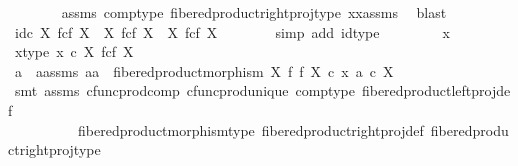 \begin{isabellebody}
\ \ \ \ \ \ \isamarkupfalse%
\ assms{\isacharparenleft}{\kern0pt}{}{\isacharparenright}{\kern0pt}\ comp{\isacharunderscore}{\kern0pt}type\ fibered{\isacharunderscore}{\kern0pt}product{\isacharunderscore}{\kern0pt}right{\isacharunderscore}{\kern0pt}proj{\isacharunderscore}{\kern0pt}type\ xx{\isacharunderscore}{\kern0pt}assms\ \isamarkupfalse%
\ blast\isanewline
\ \ \ \ \isamarkupfalse%
\ {\isachardoublequoteopen}id\isactrlsub c\ {\isacharparenleft}{\kern0pt}X\ \isactrlbsub f\isactrlesub {\isasymtimes}\isactrlsub c\isactrlbsub f\isactrlesub \ X{\isacharparenright}{\kern0pt}\ {\isacharcolon}{\kern0pt}\ X\ \isactrlbsub f\isactrlesub {\isasymtimes}\isactrlsub c\isactrlbsub f\isactrlesub \ X\ {\isasymrightarrow}\ X\ \isactrlbsub f\isactrlesub {\isasymtimes}\isactrlsub c\isactrlbsub f\isactrlesub \ X{\isachardoublequoteclose}\isanewline
\ \ \ \ \ \ \isamarkupfalse%
\ {\isacharparenleft}{\kern0pt}simp\ add{\isacharcolon}{\kern0pt}\ id{\isacharunderscore}{\kern0pt}type{\isacharparenright}{\kern0pt}\isanewline
\ \ \isamarkupfalse%
\isanewline
\ \ \ \ \isamarkupfalse%
\ x\isanewline
\ \ \ \ \isamarkupfalse%
\ x{\isacharunderscore}{\kern0pt}type{\isacharcolon}{\kern0pt}\ {\isachardoublequoteopen}x\ {\isasymin}\isactrlsub c\ X\ \isactrlbsub f\isactrlesub {\isasymtimes}\isactrlsub c\isactrlbsub f\isactrlesub \ X{\isachardoublequoteclose}\isanewline
\ \ \ \ \isamarkupfalse%
\ \isamarkupfalse%
\ a\ \ a{\isacharunderscore}{\kern0pt}assms{\isacharcolon}{\kern0pt}\ {\isachardoublequoteopen}{\isasymlangle}a{\isacharcomma}{\kern0pt}a{\isasymrangle}\ {\isacharequal}{\kern0pt}\ fibered{\isacharunderscore}{\kern0pt}product{\isacharunderscore}{\kern0pt}morphism\ X\ f\ f\ X\ {\isasymcirc}\isactrlsub c\ x{\isachardoublequoteclose}\ {\isachardoublequoteopen}a\ {\isasymin}\isactrlsub c\ X{\isachardoublequoteclose}\isanewline
\ \ \ \ \ \ \isamarkupfalse%
\ {\isacharparenleft}{\kern0pt}smt\ assms\ cfunc{\isacharunderscore}{\kern0pt}prod{\isacharunderscore}{\kern0pt}comp\ cfunc{\isacharunderscore}{\kern0pt}prod{\isacharunderscore}{\kern0pt}unique\ comp{\isacharunderscore}{\kern0pt}type\ fibered{\isacharunderscore}{\kern0pt}product{\isacharunderscore}{\kern0pt}left{\isacharunderscore}{\kern0pt}proj{\isacharunderscore}{\kern0pt}def\isanewline
\ \ \ \ \ \ \ \ \ \ fibered{\isacharunderscore}{\kern0pt}product{\isacharunderscore}{\kern0pt}morphism{\isacharunderscore}{\kern0pt}type\ fibered{\isacharunderscore}{\kern0pt}product{\isacharunderscore}{\kern0pt}right{\isacharunderscore}{\kern0pt}proj{\isacharunderscore}{\kern0pt}def\ fibered{\isacharunderscore}{\kern0pt}product{\isacharunderscore}{\kern0pt}right{\isacharunderscore}{\kern0pt}proj{\isacharunderscore}{\kern0pt}type{\isacharparenright}{\kern0pt}\isanewline

\end{isabellebody}
